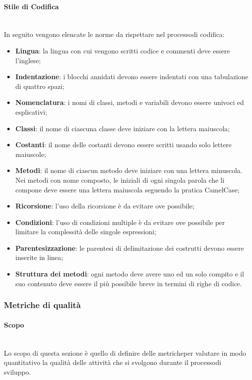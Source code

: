 \paragraph*{Stile di Codifica}\mbox{}\\ [1mm]
In seguito vengono elencate le norme da rispettare nel processo\glosp di codifica:
\begin{itemize}
	\item \textbf{Lingua}: la lingua con cui vengono scritti codice e commenti deve essere l'inglese;
	\item \textbf{Indentazione}: i blocchi annidati devono essere indentati con una tabulazione di quattro spazi;
	\item \textbf{Nomenclatura}: i nomi di classi, metodi e variabili devono essere univoci ed esplicativi;
	\item \textbf{Classi}: il nome di ciascuna classe deve iniziare con la lettera maiuscola; 
	\item \textbf{Costanti}: il nome delle costanti devono essere scritti usando solo lettere maiuscole;
	\item \textbf{Metodi}: il nome di ciascun metodo deve iniziare con una lettera minuscola. Nei metodi con nome composto, le iniziali di ogni singola parola che li compone deve essere una lettera maiuscola seguendo la pratica CamelCase;
	\item \textbf{Ricorsione}: l'uso della ricorsione è da evitare ove possibile;
	\item \textbf{Condizioni}: l'uso di condizioni multiple è da evitare ove possibile per limitare la complessità delle singole espressioni;
	\item \textbf{Parentesizzazione}: le parentesi di delimitazione dei costrutti devono essere inserite in linea;
	\item \textbf{Struttura dei metodi}: ogni metodo deve avere uno ed un solo compito e il suo contenuto deve essere il più possibile breve in termini di righe di codice.
\end{itemize}
\subsubsection{Metriche di qualità}
\paragraph*{Scopo}\mbox{}\\ [1mm]
Lo scopo di questa sezione è quello di definire delle metriche\glosp per valutare in modo quantitativo la qualità delle attività che si svolgono durante il processo\glosp di sviluppo.
